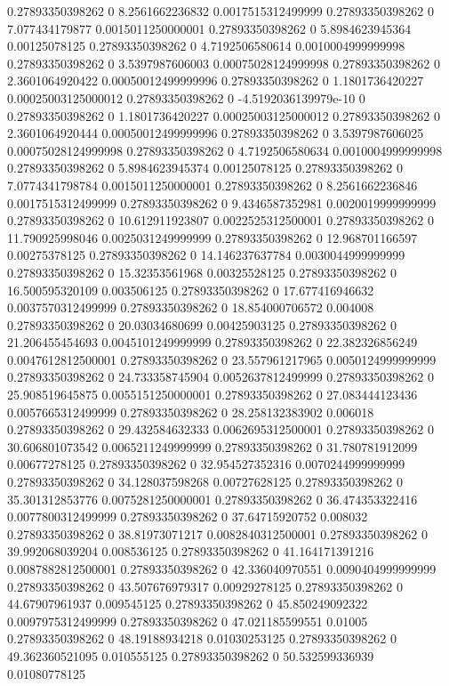 0.27893350398262 0 8.2561662236832 0.0017515312499999
0.27893350398262 0 7.077434179877 0.0015011250000001
0.27893350398262 0 5.8984623945364 0.00125078125
0.27893350398262 0 4.7192506580614 0.0010004999999998
0.27893350398262 0 3.5397987606003 0.00075028124999998
0.27893350398262 0 2.3601064920422 0.00050012499999996
0.27893350398262 0 1.1801736420227 0.00025003125000012
0.27893350398262 0 -4.5192036139979e-10 0
0.27893350398262 0 1.1801736420227 0.00025003125000012
0.27893350398262 0 2.3601064920444 0.00050012499999996
0.27893350398262 0 3.5397987606025 0.00075028124999998
0.27893350398262 0 4.7192506580634 0.0010004999999998
0.27893350398262 0 5.8984623945374 0.00125078125
0.27893350398262 0 7.0774341798784 0.0015011250000001
0.27893350398262 0 8.2561662236846 0.0017515312499999
0.27893350398262 0 9.4346587352981 0.0020019999999999
0.27893350398262 0 10.612911923807 0.0022525312500001
0.27893350398262 0 11.790925998046 0.0025031249999999
0.27893350398262 0 12.968701166597 0.00275378125
0.27893350398262 0 14.146237637784 0.0030044999999999
0.27893350398262 0 15.32353561968 0.00325528125
0.27893350398262 0 16.500595320109 0.003506125
0.27893350398262 0 17.677416946632 0.0037570312499999
0.27893350398262 0 18.854000706572 0.004008
0.27893350398262 0 20.03034680699 0.00425903125
0.27893350398262 0 21.206455454693 0.0045101249999999
0.27893350398262 0 22.382326856249 0.0047612812500001
0.27893350398262 0 23.557961217965 0.0050124999999999
0.27893350398262 0 24.733358745904 0.0052637812499999
0.27893350398262 0 25.908519645875 0.0055151250000001
0.27893350398262 0 27.083444123436 0.0057665312499999
0.27893350398262 0 28.258132383902 0.006018
0.27893350398262 0 29.432584632333 0.0062695312500001
0.27893350398262 0 30.606801073542 0.0065211249999999
0.27893350398262 0 31.780781912099 0.00677278125
0.27893350398262 0 32.954527352316 0.0070244999999999
0.27893350398262 0 34.128037598268 0.00727628125
0.27893350398262 0 35.301312853776 0.0075281250000001
0.27893350398262 0 36.474353322416 0.0077800312499999
0.27893350398262 0 37.64715920752 0.008032
0.27893350398262 0 38.81973071217 0.0082840312500001
0.27893350398262 0 39.992068039204 0.008536125
0.27893350398262 0 41.164171391216 0.0087882812500001
0.27893350398262 0 42.336040970551 0.0090404999999999
0.27893350398262 0 43.507676979317 0.00929278125
0.27893350398262 0 44.67907961937 0.009545125
0.27893350398262 0 45.850249092322 0.0097975312499999
0.27893350398262 0 47.021185599551 0.01005
0.27893350398262 0 48.19188934218 0.01030253125
0.27893350398262 0 49.362360521095 0.010555125
0.27893350398262 0 50.532599336939 0.01080778125
